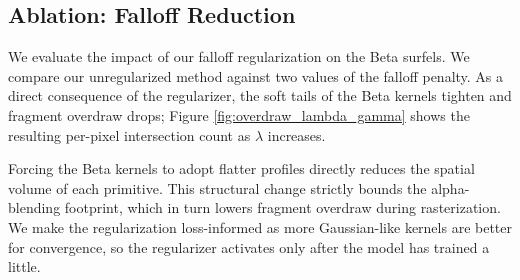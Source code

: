 \documentclass[acmtog,anonymous,review]{acmart}
\newcommand{\first}[1]{\cellcolor{red!25}\textbf{#1}}
\newcommand{\second}[1]{\cellcolor{orange!25}\textbf{#1}}
\newcommand{\third}[1]{\cellcolor{yellow!35}\textbf{#1}}
\begin{document}


\subsection{Ablation: Falloff Reduction}
We evaluate the impact of our falloff regularization on the Beta surfels. We compare our unregularized method against two values of the falloff penalty. As a direct consequence of the regularizer, the soft tails of the Beta kernels tighten and fragment overdraw drops; Figure \ref{fig:overdraw_lambda_gamma} shows the resulting per-pixel intersection count as $\lambda$ increases.

Forcing the Beta kernels to adopt flatter profiles directly reduces the spatial volume of each primitive. This structural change strictly bounds the alpha-blending footprint, which in turn lowers fragment overdraw during rasterization. We make the regularization loss-informed as more Gaussian-like kernels are better for convergence, so the regularizer activates only after the model has trained a little.
\end{document}
